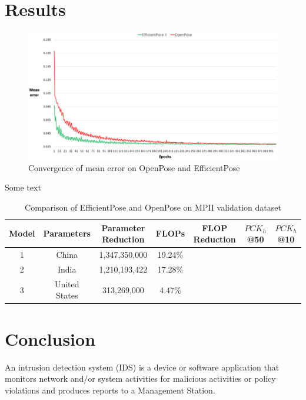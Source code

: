 \documentclass{fisatprojectfinal}
\begin{document}
\chapter{Results}

\begin{figure}[h!]
	\begin{center}
	\includegraphics[scale=0.7]{TrainProgression}
	\caption{Convergence of mean error on OpenPose and EfficientPose}
\end{center}
\end{figure}
Some text

\begin{table}[h!]
	\begin{center}
		\caption{Comparison of EfficientPose and OpenPose on MPII validation dataset} 
	\begin{tabular}{|c|c|c|c|c|c|c|}
		
	\hline Model & Parameters & Parameter Reduction  & FLOPs  & FLOP Reduction & \(PCK_h\)@50 & \(PCK_h\)@10 \\ 
	\hline 1 & China & 1,347,350,000 & 19.24\% \\ 
	\hline 2 & India & 1,210,193,422  & 17.28\% \\ 
	\hline 3 & United States & 313,269,000 & 4.47\% \\ 
	\hline 
	\end{tabular}
	\end{center}
	\end{table}



\chapter{Conclusion}

An intrusion detection system (IDS) \cite{nist} is a device or software application that monitors network and/or system activities for malicious activities or policy violations and produces reports to a Management Station.
\end{document}
